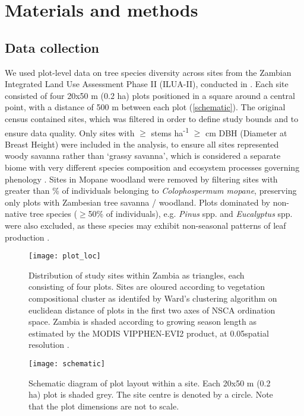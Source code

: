 \documentclass[11pt,a4paper]{article}
\begin{document}
\section{Materials and methods}

\subsection{Data collection}

We used plot-level data on tree species diversity across \nSites{} sites from the Zambian Integrated Land Use Assessment Phase II (ILUA-II), conducted in \censusDate{} \citep{Mukosha2009, Pelletier2018}. Each site consisted of four 20x50 m (0.2 ha) plots positioned in a square around a central point, with a distance of 500 m between each plot (\autoref{schematic}). The original census contained \nTotalSites{} sites, which was filtered in order to define study bounds and to ensure data quality. Only sites with $\geq$\treesHa{} stems ha\textsuperscript{-1} $\geq$\stemSize{} cm DBH (Diameter at Breast Height) were included in the analysis, to ensure all sites represented woody savanna rather than `grassy savanna', which is considered a separate biome with very different species composition and ecosystem processes governing phenology \citep{Parr2014}. Sites in Mopane woodland were removed by filtering sites with greater than \mopanePer{}\% of individuals belonging to \textit{Colophospermum mopane}, preserving only plots with Zambesian tree savanna / woodland. Plots dominated by non-native tree species ($\geq$50\% of individuals), e.g. \textit{Pinus} spp. and \textit{Eucalyptus} spp. were also excluded, as these species may exhibit non-seasonal patterns of leaf production \citep{}.

\begin{figure}[H]
\centering
	\texttt{[image: plot\_loc]}
	\caption{Distribution of study sites within Zambia as triangles, each consisting of four plots. Sites are oloured according to vegetation compositional cluster as identifed by Ward's clustering algorithm on euclidean distance of plots in the first two axes of NSCA ordination space. Zambia is shaded according to growing season length as estimated by the MODIS VIPPHEN-EVI2 product, at 0.05\textdegree spatial resolution \citep{VIPPHEN}.}
	\label{plot_loc}
\end{figure}

\begin{figure}[H]
\centering
	\texttt{[image: schematic]}
	\caption{Schematic diagram of plot layout within a site. Each 20x50 m (0.2 ha) plot is shaded grey. The site centre is denoted by a circle. Note that the plot dimensions are not to scale.}
	\label{schematic}
\end{figure}
\end{document}
